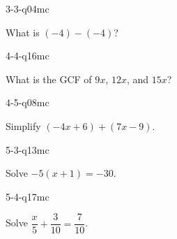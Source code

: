 \begin{practiceQuestion}{3-3-q04}{mc}
\begin{questionText}
What is $(-4) - (-4)$?
\end{questionText}
\end{practiceQuestion}

\begin{practiceQuestion}{4-4-q16}{mc}
\begin{questionText}
What is the GCF of $9x$, $12x$, and $15x$?
\end{questionText}
\end{practiceQuestion}

\begin{practiceQuestion}{4-5-q08}{mc}
\begin{questionText}
Simplify $(-4x + 6) + (7x - 9)$.
\end{questionText}
\end{practiceQuestion}

\begin{practiceQuestion}{5-3-q13}{mc}
\begin{questionText}
Solve $-5(x + 1) = -30$.
\end{questionText}
\end{practiceQuestion}

\begin{practiceQuestion}{5-4-q17}{mc}
\begin{questionText}
Solve $\dfrac{x}{5} + \dfrac{3}{10} = \dfrac{7}{10}$.
\end{questionText}
\end{practiceQuestion}

